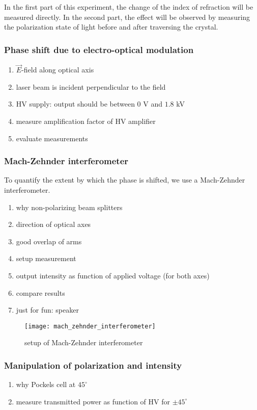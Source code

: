 In the first part of this experiment, the change of the index of
refraction will be measured directly. In the second part, the
effect will be observed by measuring the polarization state of light 
before and after traversing the crystal.

\subsubsection{Phase shift due to electro-optical modulation}
\begin{enumerate}
    \item $\vec E$-field along optical axis
    \item laser beam is incident perpendicular to the field
    \item HV supply: output should be between $0$ V and $1.8$ kV
    \item measure amplification factor of HV amplifier
    \item evaluate measurements
\end{enumerate}

\subsubsection{Mach-Zehnder interferometer}
To quantify the extent by which the phase is shifted, we use a
Mach-Zehnder interferometer.
\begin{enumerate}
    \item why non-polarizing beam splitters
    \item direction of optical axes
    \item good overlap of arms
    \item setup measurement
    \item output intensity as function of applied voltage (for both axes)
    \item compare results
    \item just for fun: speaker
\end{enumerate}
\begin{figure}[h!]
    \center
    \texttt{[image: mach\_zehnder\_interferometer]}
    \caption{setup of Mach-Zehnder interferometer}
    \label{mach_zehnder_interferometer}
\end{figure}

\subsubsection{Manipulation of polarization and intensity}
\begin{enumerate}
    \item why Pockels cell at $45^\circ$
    \item measure transmitted power as function of HV for $\pm45^\circ$
\end{enumerate}

